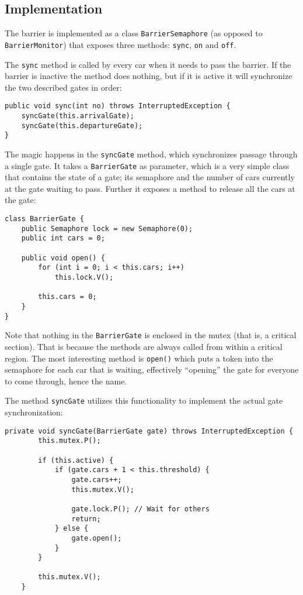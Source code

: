 \subsection*{Implementation}
The barrier is implemented as a class \texttt{BarrierSemaphore} (as opposed to \texttt{BarrierMonitor}) that exposes three methods: \texttt{sync}, \texttt{on} and \texttt{off}.

The \texttt{sync} method is called by every car when it needs to pass the barrier. If the barrier is inactive the method does nothing, but if it is active it will synchronize the two described gates in order:

\begin{lstlisting}
public void sync(int no) throws InterruptedException {
    syncGate(this.arrivalGate);
    syncGate(this.departureGate);
}
\end{lstlisting}


The magic happens in the \texttt{syncGate} method, which synchronizes passage through a single gate. It takes a \texttt{BarrierGate} as parameter, which is a very simple class that contains the state of a gate; its semaphore and the number of cars currently at the gate waiting to pass. Further it exposes a method to release all the cars at the gate:

\begin{lstlisting}
class BarrierGate {
    public Semaphore lock = new Semaphore(0);
    public int cars = 0;

    public void open() {
        for (int i = 0; i < this.cars; i++)
            this.lock.V();

        this.cars = 0;
    }
}
\end{lstlisting}

Note that nothing in the \texttt{BarrierGate} is enclosed in the mutex (that is, a critical section). That is because the methods are always called from within a critical region. The most interesting method is \texttt{open()} which puts a token into the semaphore for each car that is waiting, effectively ``opening'' the gate for everyone to come through, hence the name.

The method \texttt{syncGate} utilizes this functionality to implement the actual gate synchronization:

\begin{lstlisting}
private void syncGate(BarrierGate gate) throws InterruptedException {
        this.mutex.P();

        if (this.active) {
            if (gate.cars + 1 < this.threshold) {
                gate.cars++;
                this.mutex.V();

                gate.lock.P(); // Wait for others
                return;
            } else {
                gate.open();
            }
        }

        this.mutex.V();
    }
\end{lstlisting}


